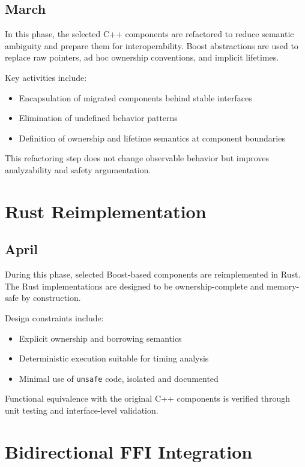 \subsection*{March}

In this phase, the selected C++ components are refactored to reduce semantic
ambiguity and prepare them for interoperability. Boost abstractions are used to
replace raw pointers, ad hoc ownership conventions, and implicit lifetimes.

Key activities include:
\begin{itemize}
    \item Encapsulation of migrated components behind stable interfaces
    \item Elimination of undefined behavior patterns
    \item Definition of ownership and lifetime semantics at component boundaries
\end{itemize}

This refactoring step does not change observable behavior but improves
analyzability and safety argumentation.

\section{Rust Reimplementation}

\subsection*{April}

During this phase, selected Boost-based components are reimplemented in Rust.
The Rust implementations are designed to be ownership-complete and memory-safe
by construction.

Design constraints include:
\begin{itemize}
    \item Explicit ownership and borrowing semantics
    \item Deterministic execution suitable for timing analysis
    \item Minimal use of \texttt{unsafe} code, isolated and documented
\end{itemize}

Functional equivalence with the original C++ components is verified through
unit testing and interface-level validation.

\section{Bidirectional \gls{FFI} Integration}


